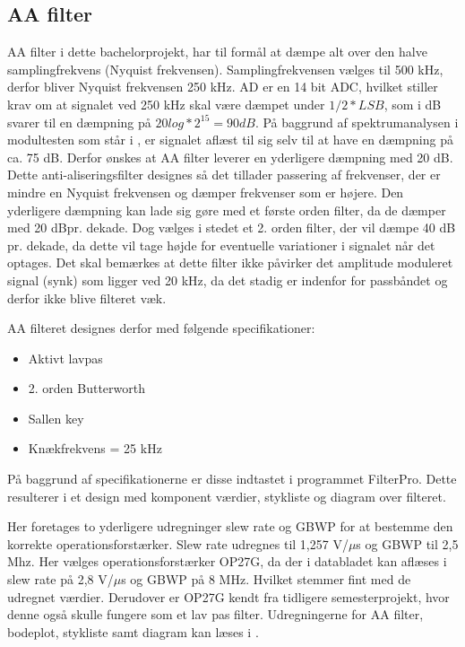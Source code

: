 \subsection{AA filter}

AA filter i dette bachelorprojekt, har til formål at dæmpe alt over den halve samplingfrekvens (Nyquist frekvensen). Samplingfrekvensen vælges til 500 kHz, derfor bliver Nyquist frekvensen 250 kHz. AD er en 14 bit ADC, hvilket stiller krav om at signalet ved 250 kHz skal være dæmpet under $1/2*LSB$, som i dB svarer til en dæmpning på $20log*2^{15}=90dB$. På baggrund af spektrumanalysen i modultesten som står i , er signalet aflæst til sig selv til at have en dæmpning på ca. 75 dB. Derfor ønskes at AA filter leverer en yderligere dæmpning med 20 dB. Dette anti-aliseringsfilter designes så det tillader passering af frekvenser, der er mindre en Nyquist frekvensen og dæmper frekvenser som er højere. Den yderligere dæmpning kan lade sig gøre med et første orden filter, da de dæmper med 20 dBpr. dekade. Dog vælges i stedet et 2. orden filter, der vil dæmpe 40 dB pr. dekade, da dette vil tage højde for eventuelle variationer i signalet når det optages. Det skal bemærkes at dette filter ikke påvirker det amplitude moduleret signal (synk) som ligger ved 20 kHz, da det stadig er indenfor for passbåndet og derfor ikke blive filteret væk.

AA filteret designes derfor med følgende specifikationer:
\begin{itemize}
\item Aktivt lavpas
\item 2. orden Butterworth
\item Sallen key
\item Knækfrekvens = 25 kHz
\end{itemize}

På baggrund af specifikationerne er disse indtastet i programmet FilterPro. Dette resulterer i et design med komponent værdier, stykliste og diagram over filteret. 

Her foretages to yderligere udregninger slew rate og GBWP for at bestemme den korrekte operationsforstærker. Slew rate udregnes til 1,257 V/$\mu$s og GBWP til 2,5 Mhz. Her vælges operationsforstærker OP27G, da der i databladet kan aflæses i slew rate på 2,8 V/$\mu$s og GBWP på 8 MHz. Hvilket stemmer fint med de udregnet værdier. Derudover er OP27G kendt fra tidligere semesterprojekt, hvor denne også skulle fungere som et lav pas filter. Udregningerne for AA filter, bodeplot, stykliste samt diagram kan læses i .


